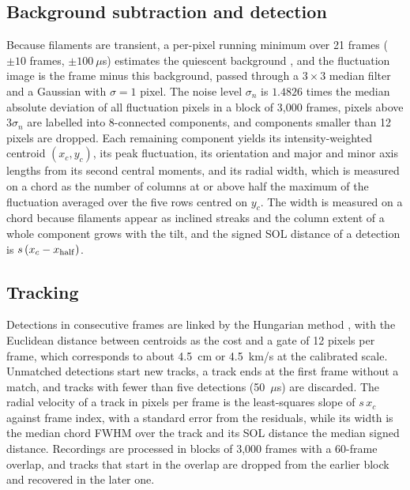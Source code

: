 \subsection{Background subtraction and detection}
Because filaments are transient, a per-pixel running minimum over 21 frames ($\pm 10$ frames, $\pm 100~\mu$s) estimates the quiescent background \citep{kirk2016filaments}, and the fluctuation image is the frame minus this background, passed through a $3 \times 3$ median filter and a Gaussian with $\sigma = 1$ pixel. The noise level $\sigma_n$ is $1.4826$ times the median absolute deviation of all fluctuation pixels in a block of 3{,}000 frames, pixels above $3\sigma_n$ are labelled into 8-connected components, and components smaller than 12 pixels are dropped. Each remaining component yields its intensity-weighted centroid $(x_c, y_c)$, its peak fluctuation, its orientation and major and minor axis lengths from its second central moments, and its radial width, which is measured on a chord as the number of columns at or above half the maximum of the fluctuation averaged over the five rows centred on $y_c$. The width is measured on a chord because filaments appear as inclined streaks and the column extent of a whole component grows with the tilt, and the signed SOL distance of a detection is $s\,(x_c - x_{\rm half})$.

\subsection{Tracking}
Detections in consecutive frames are linked by the Hungarian method \citep{kuhn1955hungarian}, with the Euclidean distance between centroids as the cost and a gate of 12 pixels per frame, which corresponds to about 4.5~cm or 4.5~km/s at the calibrated scale. Unmatched detections start new tracks, a track ends at the first frame without a match, and tracks with fewer than five detections (50~$\mu$s) are discarded. The radial velocity of a track in pixels per frame is the least-squares slope of $s\,x_c$ against frame index, with a standard error from the residuals, while its width is the median chord FWHM over the track and its SOL distance the median signed distance. Recordings are processed in blocks of 3{,}000 frames with a 60-frame overlap, and tracks that start in the overlap are dropped from the earlier block and recovered in the later one.

